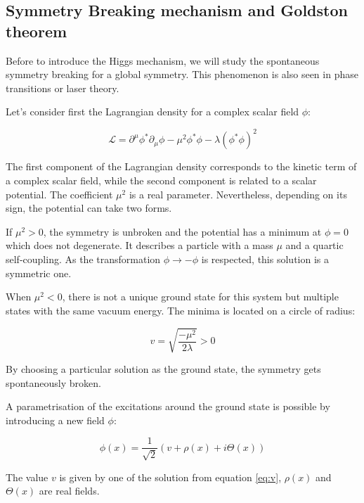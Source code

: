      \subsection{Symmetry Breaking mechanism and Goldston theorem}
    
    Before to introduce the Higgs mechanism, we will study the spontaneous symmetry breaking for a global symmetry.
    This phenomenon is also seen in phase transitions or laser theory.

    Let's consider first the Lagrangian density for a complex scalar field $\phi$:

    \begin{equation}
      \mathcal{L} = \partial^{\mu}\phi^{*} \partial_{\mu}\phi - \mu^2\phi^{*}\phi - \lambda (\phi^{*}\phi)^2
      \label{eq:ssbLagrangian}
    \end{equation}

    The first component of the Lagrangian density corresponds to the kinetic term of a complex scalar field, while the second component is related to a scalar potential.
    The coefficient $\mu^2$ is a real parameter. Nevertheless, depending on its sign, the potential can take two forms.

    If $\mu^{2} > 0$, the symmetry is unbroken and the potential has a minimum at $\phi = 0$ which does not degenerate.
    It describes a particle with a mass $\mu$ and a quartic self-coupling.
    As the transformation $\phi \rightarrow  - \phi$ is respected, this solution is a symmetric one.

    When $\mu^{2} < 0$, there is not a unique ground state for this system but multiple states with the same vacuum energy.
    The minima is located on a circle of radius:

    \begin{equation}
      v = \sqrt{\frac{- \mu^2}{2\lambda}} > 0
      \label{eq:v}
    \end{equation}

    By choosing a particular solution as the ground state, the symmetry gets spontaneously broken.

    A parametrisation of the excitations around the ground state is possible by introducing a new field $\phi$:

    \begin{equation}
      \phi(x) = \frac{1}{\sqrt{2}} \left( v + \rho(x) + i\Theta(x) \right)
    \end{equation}

    The value $v$ is given by one of the solution from equation \ref{eq:v}, $\rho(x)$ and $\Theta(x)$ are real fields.

